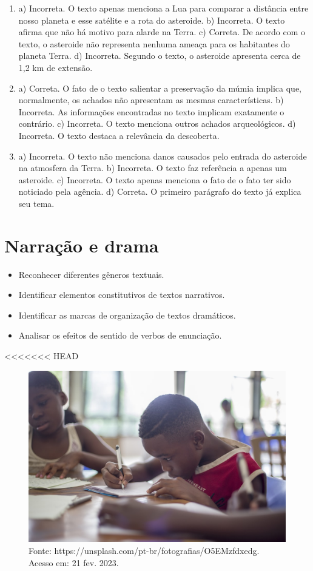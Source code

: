 \begin{enumerate}\color{rosa}
\item a) Incorreta. O texto apenas menciona a Lua para comparar a distância
entre nosso planeta e esse satélite e a rota do asteroide.
b) Incorreta. O texto afirma que não há motivo para alarde na Terra.
c) Correta. De acordo com o texto, o asteroide não representa nenhuma
ameaça para os habitantes do planeta Terra.
d) Incorreta. Segundo o texto, o asteroide apresenta cerca de 1,2 km de
extensão.

\item
a) Correta. O fato de o texto salientar a preservação da múmia implica
que, normalmente, os achados não apresentam as mesmas características.
b) Incorreta. As informações encontradas no texto implicam exatamente o
contrário.
c) Incorreta. O texto menciona outros achados arqueológicos.
d) Incorreta. O texto destaca a relevância da descoberta.


\item
a) Incorreta. O texto não menciona danos causados pelo entrada do
asteroide na atmosfera da Terra.
b) Incorreta. O texto faz referência a apenas um asteroide.
c) Incorreta. O texto apenas menciona o fato de o fato ter sido
noticiado pela agência.
d) Correta. O primeiro parágrafo do texto já explica seu tema.
\end{enumerate}

\chapter{Narração e drama}


\begin{itemize}
\item Reconhecer diferentes gêneros textuais.

\item Identificar elementos constitutivos de textos narrativos.

\item Identificar as marcas de organização de textos dramáticos.

\item Analisar os efeitos de sentido de verbos de enunciação.
\end{itemize}

<<<<<<< HEAD
\begin{figure}[htpb!]
\includegraphics[width=.5\textwidth]{./imgs/img4.jpg}
\caption{Fonte: https://unsplash.com/pt-br/fotografias/O5EMzfdxedg. Acesso em: 21 fev. 2023.}
\end{figure}

